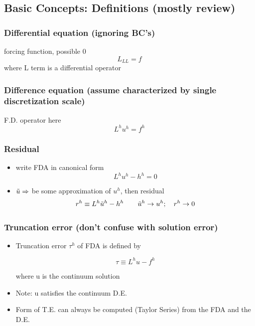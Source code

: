 \subsection{Basic Concepts: Definitions (mostly review)}

\subsubsection{Differential equation (ignoring BC's)}

forcing function, possible 0
\[ L_{LL} = f \]
where L term is a differential operator

\subsubsection{Difference equation (assume characterized by single discretization scale)}

F.D. operator here 
\[ L^hu^h = f^h\]

\subsubsection{Residual}

\begin{itemize}
    \item write FDA in canonical form
    \[ L^h u^h - h^h = 0\]

    \item $\Tilde{u} \Rightarrow$ be some approximation of $u^h$, then residual
    \[r^h \equiv L^h \Tilde{u}^h - h^h \qquad \Tilde{u}^h \rightarrow u^h; \quad r^h \rightarrow 0\]
\end{itemize}


\subsubsection{Truncation error (don't confuse with solution error)}

\begin{itemize}
    \item Truncation error $\tau^h$ of FDA is defined by 

    \[ \tau \equiv L^h u - f^h\]

    where u is the continuum solution

    \item Note: u satisfies the continuum D.E.

    \item  Form of T.E. can always be computed (Taylor Series) from the FDA and the D.E.
\end{itemize}

